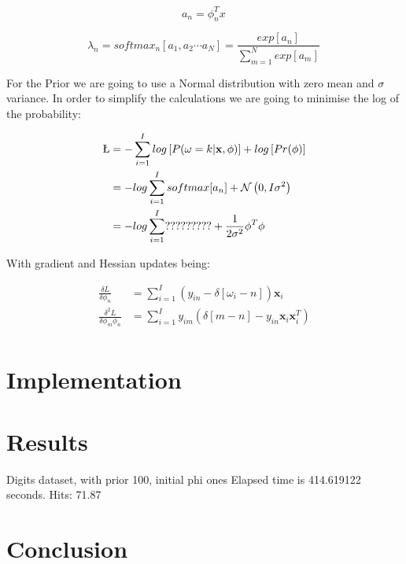 \documentclass[12pt]{article}
\begin{document}
\begin{equation}
\label{activations}
a_{n} = \phi_{n}^{T}x\,
\end{equation}

\begin{equation}
\label{softmax}
\lambda_{n} = softmax_{n}[a_{1}, a_{2} \cdots a_{N}] = 
\frac{exp[a_{n}]} {\sum_{m = 1}^{N} exp[a_{m}] }\,
\end{equation}

For the Prior we are going to use a Normal distribution with zero mean and $\sigma$ variance.
In order to simplify the calculations we are going to minimise the log of the probability:

\begin{align}
\label{L}
\L &= - \sum_{i = 1}^{I} log \left[ P(\omega = k | \mathbf{x}, \phi) \right]  + log \left[ Pr(\phi) \right] \nonumber \\
&= - log \sum_{i = 1}^{I} softmax[a_{n}] + \mathcal{N} \left( 0, I \sigma^{2} \right) \nonumber \\
&= - log \sum_{i = 1}^{I} ????????? + \frac{1}{2 \sigma^{2}} \phi^{T} \phi 
\end{align}

With gradient and Hessian updates being:

\begin{align}
\label{L}
\frac{\delta L}{ \delta \phi_{n}} &= \sum_{i = 1}^{I} \left( y_{in} - \delta \left[ \omega_{i} - n \right] \right) \mathbf{x}_{i} \nonumber \\
\frac{\delta^{2} L}{ \delta \phi_{m}\phi_{n}} &= \sum_{i = 1}^{I} y_{im} \left( \delta \left[ m - n \right] - y_{in} \mathbf{x}_{i} \mathbf{x}_{i}^{T}  \right) \nonumber \\
\end{align}
 
\section{Implementation}


\section{Results}

Digits dataset, with prior 100, initial phi ones
Elapsed time is 414.619122 seconds.
Hits: 71.87%

\section{Conclusion}


 
\end{document}
